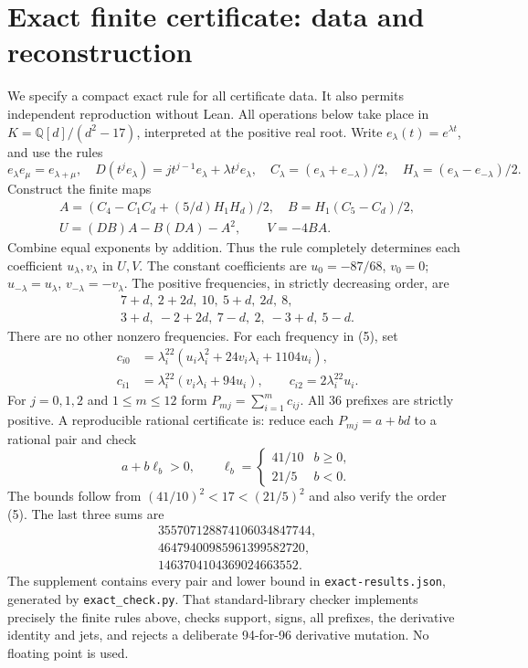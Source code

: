 \documentclass[11pt]{article}
\begin{document}
\section{Exact finite certificate: data and reconstruction}
We specify a compact exact rule for all certificate data. It also permits independent reproduction without Lean. All operations below take place in $K=\mathbb Q[d]/(d^2-17)$, interpreted at the positive real root. Write $e_\lambda(t)=e^{\lambda t}$, and use the rules
\[
 e_\lambda e_\mu=e_{\lambda+\mu},\quad
 D(t^je_\lambda)=j t^{j-1}e_\lambda+\lambda t^je_\lambda,
 \quad C_\lambda=(e_\lambda+e_{-\lambda})/2,\quad
 H_\lambda=(e_\lambda-e_{-\lambda})/2.
\]
Construct the finite maps
\[
\begin{gathered}
 A=(C_4-C_1C_d+(5/d)H_1H_d)/2,\quad B=H_1(C_5-C_d)/2,\\
 U=(DB)A-B(DA)-A^2,\qquad V=-4BA.
\end{gathered}
\]
Combine equal exponents by addition. Thus the rule completely determines each coefficient $u_\lambda,v_\lambda$ in $U,V$. The constant coefficients are $u_0=-87/68$, $v_0=0$; $u_{-\lambda}=u_\lambda$, $v_{-\lambda}=-v_\lambda$. The positive frequencies, in strictly decreasing order, are
\[
\begin{gathered}
7+d,\ 2+2d,\ 10,\ 5+d,\ 2d,\ 8,\\
3+d,\ -2+2d,\ 7-d,\ 2,\ -3+d,\ 5-d.
\end{gathered}                                                     \tag{5}
\]
There are no other nonzero frequencies. For each frequency in (5), set
\begin{align*}
 c_{i0}&=\lambda_i^{22}(u_i\lambda_i^2+24v_i\lambda_i+1104u_i),\\
 c_{i1}&=\lambda_i^{22}(v_i\lambda_i+94u_i),\qquad
 c_{i2}=2\lambda_i^{22}u_i.
\end{align*}
For $j=0,1,2$ and $1\le m\le12$ form $P_{mj}=\sum_{i=1}^m c_{ij}$. All 36 prefixes are strictly positive. A reproducible rational certificate is: reduce each $P_{mj}=a+bd$ to a rational pair and check
\[
 a+b\ell_b>0,\qquad
 \ell_b=\begin{cases}41/10&b\ge0,\\21/5&b<0.\end{cases}             \tag{6}
\]
The bounds follow from $(41/10)^2<17<(21/5)^2$ and also verify the order (5). The last three sums are
\[
\begin{array}{r}
355707128874106034847744,\\
46479400985961399582720,\\
1463704104369024663552.
\end{array}
\]
The supplement contains every pair and lower bound in \texttt{exact-results.json}, generated by \texttt{exact\_check.py}. That standard-library checker implements precisely the finite rules above, checks support, signs, all prefixes, the derivative identity and jets, and rejects a deliberate 94-for-96 derivative mutation. No floating point is used.
\newpage
\end{document}
